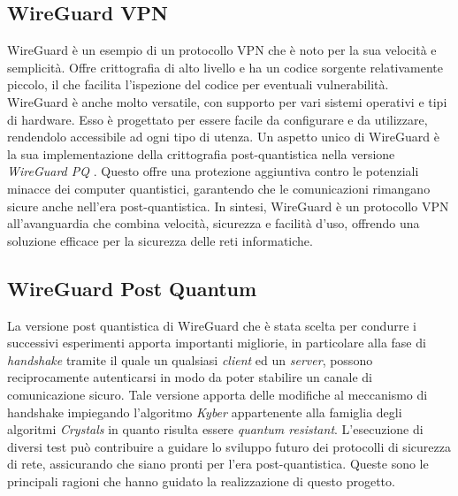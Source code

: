 \subsection{WireGuard VPN}
WireGuard \cite{WireGuard} è un esempio di un protocollo VPN che è noto per la sua velocità e semplicità. Offre crittografia di alto livello e ha un codice sorgente relativamente piccolo, il che facilita l’ispezione del codice per eventuali vulnerabilità. WireGuard è anche molto versatile, con supporto per vari sistemi operativi e tipi di hardware. Esso è progettato per essere facile da configurare e da utilizzare, rendendolo accessibile ad ogni tipo di utenza. Un aspetto unico di WireGuard è la sua implementazione della crittografia post-quantistica nella versione \emph{WireGuard PQ} \cite{WireGuardPQ}. Questo offre una protezione aggiuntiva contro le potenziali minacce dei computer quantistici, garantendo che le comunicazioni rimangano sicure anche nell’era post-quantistica. In sintesi, WireGuard è un protocollo VPN all’avanguardia che combina velocità, sicurezza e facilità d’uso, offrendo una soluzione efficace per la sicurezza delle reti informatiche.

\subsection{WireGuard Post Quantum}
La versione post quantistica di WireGuard \cite{WPQ} che è stata scelta per condurre i successivi esperimenti apporta importanti migliorie, in particolare alla fase di \emph{handshake} tramite il quale un qualsiasi \emph{client} ed un \emph{server}, possono reciprocamente autenticarsi in modo da poter stabilire un canale di comunicazione sicuro. Tale versione apporta delle modifiche al meccanismo di handshake impiegando l'algoritmo \emph{Kyber} appartenente alla famiglia degli algoritmi \emph{Crystals} \cite{crystal} in quanto risulta essere \emph{quantum resistant}. L'esecuzione di diversi test può contribuire a guidare lo sviluppo futuro dei protocolli di sicurezza di rete, assicurando che siano pronti per l’era post-quantistica. Queste sono le principali ragioni che hanno guidato la realizzazione di questo progetto.

